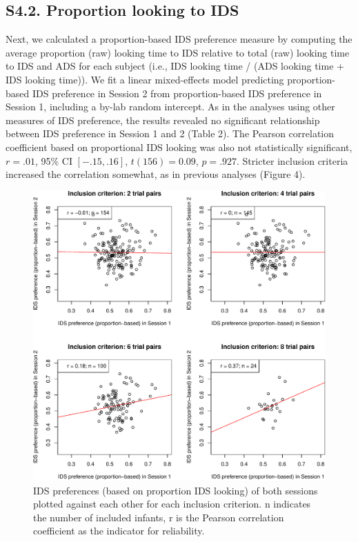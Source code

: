 \documentclass[
  man, donotrepeattitle,floatsintext]{apa6}
\begin{document}
\hypertarget{s4.2.-proportion-looking-to-ids}{%
\subsection{S4.2. Proportion looking to IDS}\label{s4.2.-proportion-looking-to-ids}}

Next, we calculated a proportion-based IDS preference measure by computing the average proportion (raw) looking time to IDS relative to total (raw) looking time to IDS and ADS for each subject (i.e., IDS looking time / (ADS looking time + IDS looking time)).
We fit a linear mixed-effects model predicting proportion-based IDS preference in Session 2 from proportion-based IDS preference in Session 1, including a by-lab random intercept.
As in the analyses using other measures of IDS preference, the results revealed no significant relationship between IDS preference in Session 1 and 2 (Table 2).
The Pearson correlation coefficient based on proportional IDS looking was also not statistically significant, \(r = .01\), 95\% CI \([-.15, .16]\), \(t(156) = 0.09\), \(p = .927\).
Stricter inclusion criteria increased the correlation somewhat, as in previous analyses (Figure 4).

\begin{figure}

{\centering \includegraphics[width=5in]{MB1T_supplement_files/figure-latex/unnamed-chunk-10-1} 

}

\caption{IDS preferences (based on proportion IDS looking) of both sessions plotted against each other for each inclusion criterion. n indicates the number of included infants, r is the Pearson correlation coefficient as the indicator for reliability.}\label{fig:unnamed-chunk-10}
\end{figure}
\end{document}
